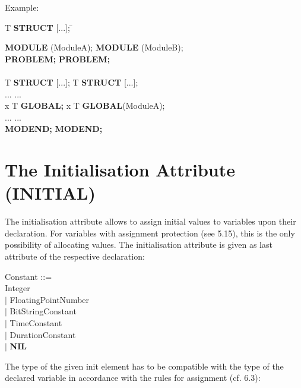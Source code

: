 Example:

\begin{tabbing}
 T {\bf STRUCT} [...]; \hspace{2cm} \= \kill

{\bf MODULE} (ModuleA);            \> {\bf MODULE} (ModuleB);\\
{\bf PROBLEM;}                      \> {\bf PROBLEM;}\\
                                    \> \\
 T {\bf STRUCT} [...]; \>  T {\bf STRUCT} [...];\\
\x ...                              \> \x ... \\
 x T {\bf GLOBAL;}      \>  x T {\bf GLOBAL}(ModuleA); \\
\x ...                              \> \x ...\\
{\bf MODEND;}                       \> {\bf MODEND;}
\end{tabbing}


\section{The Initialisation Attribute (INITIAL)}   %

The initialisation attribute allows to assign initial values to
variables upon their declaration. For variables with assignment
protection (see 5.15), this is the only possibility of allocating
values. The initialisation attribute is given as last attribute of the
respective declaration:





\begin{front}
Constant ::=\\
\x Integer\\
\x $\mid$ FloatingPointNumber\\
\x $\mid$ BitStringConstant\\
\x $\mid$ TimeConstant\\
\x $\mid$ DurationConstant\\
\x $\mid$ {\bf NIL}
\end{front}
\begin{grammar}

\end{grammar}

The type of the given init element has to be compatible with the type of
the declared variable in accordance with the rules for assignment (cf.
6.3):

